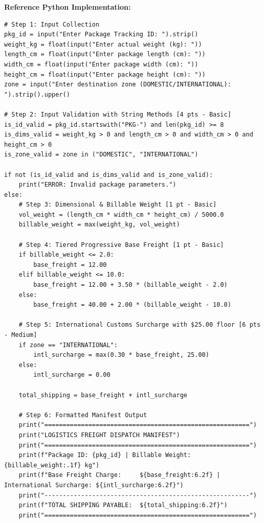 \documentclass[11pt,a4paper]{article}
\begin{document}
\textbf{Reference Python Implementation:}
\begin{lstlisting}
# Step 1: Input Collection
pkg_id = input("Enter Package Tracking ID: ").strip()
weight_kg = float(input("Enter actual weight (kg): "))
length_cm = float(input("Enter package length (cm): "))
width_cm = float(input("Enter package width (cm): "))
height_cm = float(input("Enter package height (cm): "))
zone = input("Enter destination zone (DOMESTIC/INTERNATIONAL): ").strip().upper()

# Step 2: Input Validation with String Methods [4 pts - Basic]
is_id_valid = pkg_id.startswith("PKG-") and len(pkg_id) >= 8
is_dims_valid = weight_kg > 0 and length_cm > 0 and width_cm > 0 and height_cm > 0
is_zone_valid = zone in ("DOMESTIC", "INTERNATIONAL")

if not (is_id_valid and is_dims_valid and is_zone_valid):
    print("ERROR: Invalid package parameters.")
else:
    # Step 3: Dimensional & Billable Weight [1 pt - Basic]
    vol_weight = (length_cm * width_cm * height_cm) / 5000.0
    billable_weight = max(weight_kg, vol_weight)

    # Step 4: Tiered Progressive Base Freight [1 pt - Basic]
    if billable_weight <= 2.0:
        base_freight = 12.00
    elif billable_weight <= 10.0:
        base_freight = 12.00 + 3.50 * (billable_weight - 2.0)
    else:
        base_freight = 40.00 + 2.00 * (billable_weight - 10.0)

    # Step 5: International Customs Surcharge with $25.00 floor [6 pts - Medium]
    if zone == "INTERNATIONAL":
        intl_surcharge = max(0.30 * base_freight, 25.00)
    else:
        intl_surcharge = 0.00

    total_shipping = base_freight + intl_surcharge

    # Step 6: Formatted Manifest Output
    print("========================================================")
    print("LOGISTICS FREIGHT DISPATCH MANIFEST")
    print("========================================================")
    print(f"Package ID: {pkg_id} | Billable Weight: {billable_weight:.1f} kg")
    print(f"Base Freight Charge:     ${base_freight:6.2f} | International Surcharge: ${intl_surcharge:6.2f}")
    print("--------------------------------------------------------")
    print(f"TOTAL SHIPPING PAYABLE:  ${total_shipping:6.2f}")
    print("========================================================")
\end{lstlisting}
\end{document}
